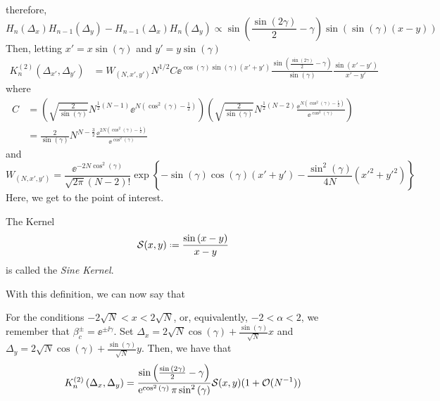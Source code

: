 therefore,
\begin{equation}
	H_n(\Delta_x)H_{n-1}(\Delta_y) - H_{n-1}(\Delta_x)H_n(\Delta_y) \propto \sin{\left(\frac{\sin{(2\gamma)}}{2}-\gamma\right)} \sin{\left( \sin{(\gamma)}(x - y) \right)}
\end{equation}
Then, letting $x' = x \sin{(\gamma)}$ and $y' = y \sin{(\gamma)}$
\begin{align}
	K_n^{(2)}(\Delta_{x'},\Delta_{y'}) & = W_{(N,x',y')} N^{1/2} C \ee^{\cos{(\gamma)}\sin{(\gamma)}(x' + y')} \frac{\sin{\left(\frac{\sin{(2\gamma)}}{2}-\gamma\right)} }{\sin{(\gamma)}}\frac{\sin{(x' - y')}}{x'-y'}
\end{align}
where
\begin{align}
	C & = \left(\sqrt{\frac{2}{\sin{(\gamma)}}}
	N^{\frac{1}{2}(N-1)}
	\ee^{N\left(\cos^2{(\gamma)} - \frac{1}{2} \right)} \right) 
	\left( \sqrt{\frac{2}{\sin{(\gamma)}}} 
	N^{\frac{1}{2}(N-2)}
	\frac{\ee^{N\left(\cos^2{(\gamma)} - \frac{1}{2} \right)}}{\ee^{\cos^2{(\gamma)} }}
	\right) \\
	& = \frac{2}{\sin{(\gamma)}}
	N^{N - \frac{3}{2}}
	\frac{\ee^{2N\left(\cos^2{(\gamma)} - \frac{1}{2} \right)}}{\ee^{\cos^2{(\gamma)}}}
\end{align}
and
\begin{equation}
	W_{(N,x',y')} = \frac{\ee^{-2N\cos^2{(\gamma)}}}{\sqrt{2\pi} (N-2)!}
	\exp{\left\{-\sin{(\gamma)}\cos{(\gamma)} (x'+y') - \frac{\sin^2{(\gamma)}}{4N} (x'^2 + y'^2) \right\}} 
\end{equation}
Here, we get to the point of interest. 
\begin{definicao}
	The Kernel
	\begin{equation}
		\Sine(x, y) \deff \frac{\sin{(x  -y)}}{x - y}
	\end{equation}
	is called the \textit{Sine Kernel}.
\end{definicao}
With this definition, we can now say that 
\begin{teorema}
	For the conditions $-2\sqrt{N} < x < 2\sqrt{N}$, or, equivalently, $-2 < \alpha < 2$, we remember that $\beta_c^\pm = \ee^{\pm \ii \gamma}$. Set $\Delta_x = 2\sqrt{N}\cos(\gamma) + \frac{\sin{(\gamma)}}{\sqrt{N}} x$ and $\Delta_y = 2\sqrt{N}\cos(\gamma) + \frac{\sin{(\gamma)}}{\sqrt{N}} y$. Then, we have that
	\begin{equation}
		K_n^{(2)}\left(\Delta_x, \Delta_y\right) = \frac{\sin{\left(\frac{\sin{(2\gamma)}}{2}-\gamma\right)}}{\operatorname{e}^{\cos^2{(\gamma)}} \pi \sin^2{(\gamma)}} \mathcal{S}(x, y) (1 + \mathcal{O}(N^{-1}))
	\end{equation}
\end{teorema}
